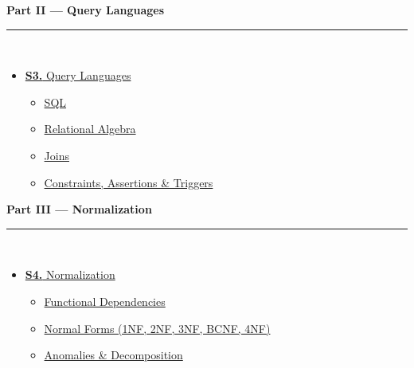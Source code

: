 \documentclass[12pt,a3paper]{article}
\begin{document}
\begin{tcolorbox}[breakable,colback=cB!5,colframe=cB,boxrule=1pt,arc=5pt,
  left=8pt,right=8pt,top=8pt,bottom=8pt,before skip=4pt]
  {\large\bfseries\textcolor{cB}{Part II --- Query Languages}}\\[5pt]
  \textcolor{cB!40}{\rule{\textwidth}{0.4pt}}\\[3pt]
  \small\begin{itemize}[leftmargin=1.2em,itemsep=1pt,label={\textcolor{cB}{$\triangleright$}}]
    \item \hyperref[sec:S3]{\textbf{S3.} Query Languages}
      \begin{itemize}[leftmargin=1.5em,itemsep=0pt,label={\textcolor{cB}{$\cdot$}}]
        \item \hyperref[sub:s3-sql]{SQL}
        \item \hyperref[sub:s3-relalg]{Relational Algebra}
        \item \hyperref[sub:s3-joins]{Joins}
        \item \hyperref[sub:s3-constraints]{Constraints, Assertions \& Triggers}
      \end{itemize}
  \end{itemize}
\end{tcolorbox}

\begin{tcolorbox}[breakable,colback=cC!5,colframe=cC,boxrule=1pt,arc=5pt,
  left=8pt,right=8pt,top=8pt,bottom=8pt,before skip=4pt]
  {\large\bfseries\textcolor{cC}{Part III --- Normalization}}\\[5pt]
  \textcolor{cC!40}{\rule{\textwidth}{0.4pt}}\\[3pt]
  \small\begin{itemize}[leftmargin=1.2em,itemsep=1pt,label={\textcolor{cC}{$\triangleright$}}]
    \item \hyperref[sec:S4]{\textbf{S4.} Normalization}
      \begin{itemize}[leftmargin=1.5em,itemsep=0pt,label={\textcolor{cC}{$\cdot$}}]
        \item \hyperref[sub:s4-fd]{Functional Dependencies}
        \item \hyperref[sub:s4-nf]{Normal Forms (1NF, 2NF, 3NF, BCNF, 4NF)}
        \item \hyperref[sub:s4-anomaly]{Anomalies \& Decomposition}
      \end{itemize}
  \end{itemize}
\end{tcolorbox}
\end{document}
